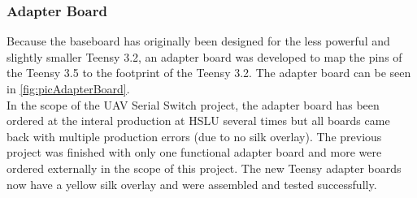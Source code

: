\subsubsection{Adapter Board}
%
Because the baseboard has originally been designed for the less powerful and slightly smaller Teensy 3.2, an adapter board was developed to map the pins of the Teensy 3.5 to the footprint of the Teensy 3.2. The adapter board can be seen in \autoref{fig:picAdapterBoard}.\\
In the scope of the UAV Serial Switch project, the adapter board has been ordered at the interal production at HSLU several times but all boards came back with  multiple production errors (due to no silk overlay). The previous project was finished with only one functional adapter board and more were ordered externally in the scope of this project. The new Teensy adapter boards now have a yellow silk overlay and were assembled and tested successfully.
%
